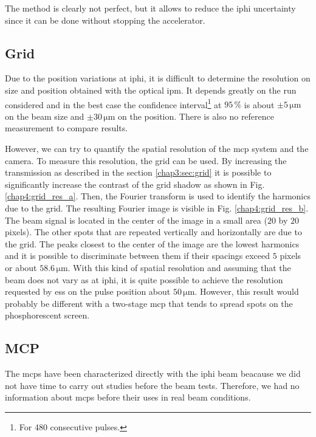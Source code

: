 \begin{refsection}
  The method is clearly not perfect, but it allows to reduce the \acrshort{iphi} uncertainty since it can be done without stopping the accelerator.

  \subsection{Grid}

  Due to the position variations at \acrshort{iphi}, it is difficult to determine the resolution on size and position obtained with the optical \acrshort{ipm}. It depends greatly on the run considered and in the best case the confidence interval\footnote{For 480 consecutive pulses.} at $95\,\mathrm{\%}$ is about $\pm 5\,\mathrm{\mu m}$ on the beam size and $\pm 30\,\mathrm{\mu m}$ on the position. There is also no reference measurement to compare results.

  However, we can try to quantify the spatial resolution of the \acrshort{mcp} system and the camera.
  To measure this resolution, the grid can be used. By increasing the transmission as described in the section \ref{chap3:sec:grid} it is possible to significantly increase the contrast of the grid shadow as shown in Fig. \ref{chap4:grid_res_a}. Then, the Fourier transform is used to identify the harmonics due to the grid. The resulting Fourier image is visible in Fig. \ref{chap4:grid_res_b}. The beam signal is located in the center of the image in a small area ($20$ by $20$ pixels). The other spots that are repeated vertically and horizontally are due to the grid. The peaks closest to the center of the image are the lowest harmonics and it is possible to discriminate between them if their spacings exceed $5$ pixels or about $58.6\,\mathrm{\mu m}$. With this kind of spatial resolution and assuming that the beam does not vary as at \acrshort{iphi}, it is quite possible to achieve the resolution requested by \acrshort{ess} on the pulse position about $50\,\mathrm{\mu m}$. However, this result would probably be different with a two-stage \acrshort{mcp} that tends to spread spots on the phosphorescent screen.

  

  \subsection{MCP}
  The \acrshort{mcp}s have been characterized directly with the \acrshort{iphi} beam beacause we did not have time to carry out studies before the beam tests. Therefore, we had no information about \acrshort{mcp}s before their uses in real beam conditions.


\end{refsection}
